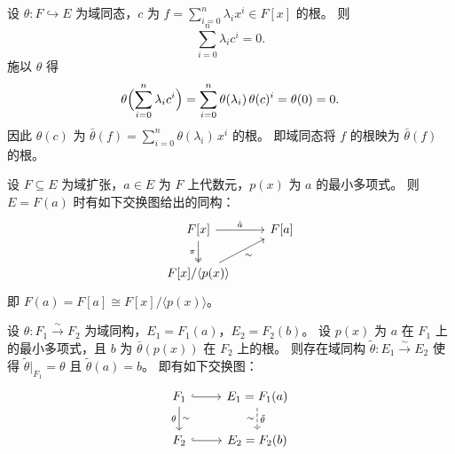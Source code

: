 \documentclass[lang=cn,a4paper,newtx]{elegantbook}
\begin{document}
\begin{remark}
  设 $\theta\colon F\hookrightarrow E$ 为域同态，$c$ 为 $f=\sum_{i=0}^{n}\lambda_i x^i\in F[x]$ 的根。
  则
  \[
    \sum_{i=0}^{n}\lambda_i c^i=0.
  \]
  施以 $\theta$ 得
  \[
    \theta\Bigl(\sum_{i=0}^{n}\lambda_i c^i\Bigr)=\sum_{i=0}^{n}\theta(\lambda_i)\,\theta(c)^i=\theta(0)=0.
  \]
  因此 $\theta(c)$ 为 $\bar\theta(f)=\sum_{i=0}^{n}\theta(\lambda_i)\,x^i$ 的根。
  即域同态将 $f$ 的根映为 $\bar\theta(f)$ 的根。
\end{remark}

\begin{proposition}
  设 $F\subseteq E$ 为域扩张，$a\in E$ 为 $F$ 上代数元，$p(x)$ 为 $a$ 的最小多项式。
  则 $E=F(a)$ 时有如下交换图给出的同构：
  \[
    \begin{tikzcd}
      F[x] \arrow[r,"\hat a"] \arrow[d,two heads,"\pi"'] & F[a] \\
      F[x]/\langle p(x)\rangle \arrow[ur,"\sim"']
    \end{tikzcd}
  \]
  即 $F(a)=F[a]\cong F[x]/\langle p(x)\rangle$。
\end{proposition}

\begin{lemma}\label{field-iso-extension}
  设 $\theta\colon F_1\xrightarrow{\sim} F_2$ 为域同构，$E_1=F_1(a)$，$E_2=F_2(b)$。
  设 $p(x)$ 为 $a$ 在 $F_1$ 上的最小多项式，且 $b$ 为 $\bar\theta(p(x))$ 在 $F_2$ 上的根。
  则存在域同构 $\tilde\theta\colon E_1\xrightarrow{\sim} E_2$ 使得 $\tilde\theta\big|_{F_1}=\theta$ 且 $\tilde\theta(a)=b$。
  即有如下交换图：
  \[
    \begin{tikzcd}
      F_1 \arrow[r,hook] \arrow[d,"\theta"',"\sim"] & E_1=F_1(a) \arrow[d,dashed,"\tilde\theta","\sim"'] \\
      F_2 \arrow[r,hook] & E_2=F_2(b)
    \end{tikzcd}
  \]
\end{lemma}
\end{document}
